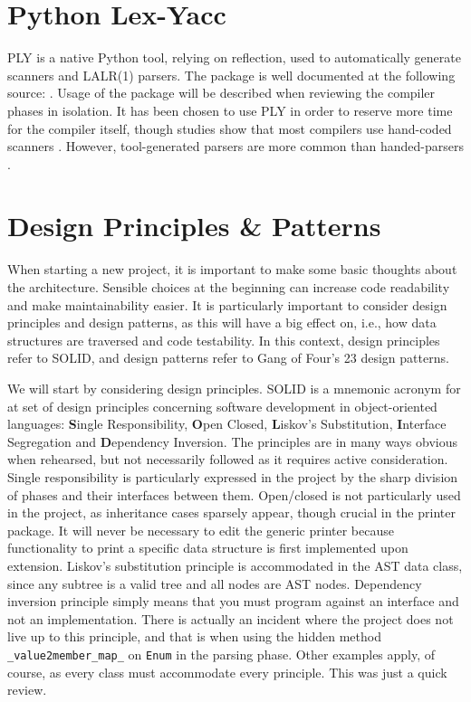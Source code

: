 \section{Python Lex-Yacc}
PLY is a native Python tool, relying on reflection, used to automatically generate scanners and LALR(1) parsers. The package is well documented at the following source: \cite{ply}. Usage of the package will be described when reviewing the compiler phases in isolation. It has been chosen to use PLY in order to reserve more time for the compiler itself, though studies show that most compilers use hand-coded scanners \parencite[69]{EnginneringACompiler}. However, tool-generated parsers are more common than handed-parsers \parencite[85]{EnginneringACompiler}.

\section{Design Principles \& Patterns}
When starting a new project, it is important to make some basic thoughts about the architecture. Sensible choices at the beginning can increase code readability and make maintainability easier. It is particularly important to consider design principles and design patterns, as this will have a big effect on, i.e., how data structures are traversed and code testability. In this context, design principles refer to SOLID, and design patterns refer to Gang of Four's 23 design patterns.

We will start by considering design principles. SOLID is a mnemonic acronym for at set of design principles concerning software development in object-oriented languages: \textbf{S}ingle Responsibility, \textbf{O}pen Closed, \textbf{L}iskov's Substitution, \textbf{I}nterface Segregation and \textbf{D}ependency Inversion. The principles are in many ways obvious when rehearsed, but not necessarily followed as it requires active consideration. Single responsibility is particularly expressed in the project by the sharp division of phases and their interfaces between them. Open/closed is not particularly used in the project, as inheritance cases sparsely appear, though crucial in the printer package. It will never be necessary to edit the generic printer because functionality to print a specific data structure is first implemented upon extension. Liskov's substitution principle is accommodated in the AST data class, since any subtree is a valid tree and all nodes are AST nodes. Dependency inversion principle simply means that you must program against an interface and not an implementation. There is actually an incident where the project does not live up to this principle, and that is when using the hidden method \texttt{\_value2member\_map\_} on \texttt{Enum} in the parsing phase. Other examples apply, of course, as every class must accommodate every principle. This was just a quick review.

